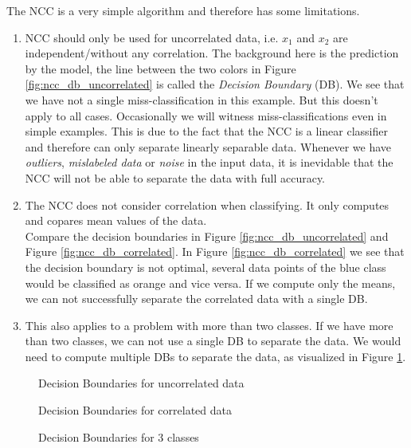 The NCC is a very simple algorithm and therefore has some limitations.
\begin{enumerate}
  \item NCC should only be used for uncorrelated data, i.e. $x_1$ and $x_2$ are independent/without any correlation.
    The background here is the prediction by the model, the line between the two colors in Figure \ref{fig:ncc_db_uncorrelated} is called the \textit{Decision Boundary} (DB). We see that
    we have not a single miss-classification in this example. But this doesn't apply to all cases.
    Occasionally we will witness miss-classifications even in simple examples.
    This is due to the fact that the NCC is a linear classifier and therefore can only separate linearly separable data. Whenever we have \textit{outliers}, \textit{mislabeled data} or \textit{noise} in the input data, it is inevidable that the NCC will not be able to separate the data with full accuracy.
  \item The NCC does not consider correlation when classifying. It only computes and copares mean values of the data.\\
    Compare the decision boundaries in Figure \ref{fig:ncc_db_uncorrelated} and Figure \ref{fig:ncc_db_correlated}. In Figure \ref{fig:ncc_db_correlated} we see that the decision boundary is not optimal, several data points of the blue class would be classified as orange and vice versa.
    If we compute only the means, we can not successfully separate the correlated data with a single DB.
  \item This also applies to a problem with more than two classes. If we have more than two classes, we can not use a single DB to separate the data.
    We would need to compute multiple DBs to separate the data, as visualized in Figure \ref{fig:ncc_db_3_class}.
\end{enumerate}

\begin{figure}[h]
  \centering
  \begin{minipage}{.45\textwidth}
  \centering
    
    \caption{Decision Boundaries for uncorrelated data}
    \label{fig:ncc_db_uncorrelated}
  \end{minipage}
  \hfill
  \begin{minipage}{.45\textwidth}
  \centering
    
    \caption{Decision Boundaries for correlated data}
    \label{fig:ncc_db_correlated}
  \end{minipage}\newline
  \hfill
  \begin{minipage}{.45\textwidth}
  \centering
    
    \caption{Decision Boundaries for 3 classes}
    \label{fig:ncc_db_3_class}
  \end{minipage}
  \hfill
\end{figure}

